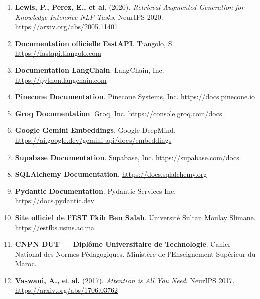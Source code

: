 \documentclass[12pt, a4paper, twoside]{report}
\begin{document}
\begin{enumerate}
  \item \textbf{Lewis, P., Perez, E., et al.} (2020). \textit{Retrieval-Augmented Generation for Knowledge-Intensive NLP Tasks}. NeurIPS 2020. \url{https://arxiv.org/abs/2005.11401}

  \item \textbf{Documentation officielle FastAPI}. Tiangolo, S. \url{https://fastapi.tiangolo.com}

  \item \textbf{Documentation LangChain}. LangChain, Inc. \url{https://python.langchain.com}

  \item \textbf{Pinecone Documentation}. Pinecone Systems, Inc. \url{https://docs.pinecone.io}

  \item \textbf{Groq Documentation}. Groq, Inc. \url{https://console.groq.com/docs}

  \item \textbf{Google Gemini Embeddings}. Google DeepMind. \url{https://ai.google.dev/gemini-api/docs/embeddings}

  \item \textbf{Supabase Documentation}. Supabase, Inc. \url{https://supabase.com/docs}

  \item \textbf{SQLAlchemy Documentation}. \url{https://docs.sqlalchemy.org}

  \item \textbf{Pydantic Documentation}. Pydantic Services Inc. \url{https://docs.pydantic.dev}

  \item \textbf{Site officiel de l'EST Fkih Ben Salah}. Université Sultan Moulay Slimane. \url{https://estfbs.usms.ac.ma}

  \item \textbf{CNPN DUT --- Diplôme Universitaire de Technologie}. Cahier National des Normes Pédagogiques. Ministère de l'Enseignement Supérieur du Maroc.

  \item \textbf{Vaswani, A., et al.} (2017). \textit{Attention is All You Need}. NeurIPS 2017. \url{https://arxiv.org/abs/1706.03762}
\end{enumerate}

\cleardoublepage

\appendix
\end{document}

